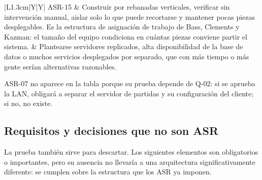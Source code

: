 \begin{tabla}{|L{1.3cm}|Y|Y|}
ASR-15 &
Construir por rebanadas verticales, verificar sin intervención manual, aislar solo lo que puede recortarse y mantener pocas piezas desplegables. Es la estructura de asignación de trabajo de Bass, Clements y Kazman: el tamaño del equipo condiciona en cuántas piezas conviene partir el sistema. &
Plantearse servidores replicados, alta disponibilidad de la base de datos o muchos servicios desplegados por separado, que con más tiempo o más gente serían alternativas razonables. \\ \hline
\end{tabla}

ASR-07 no aparece en la tabla porque su prueba depende de Q-02: si se aprueba la LAN, obligará a separar el servidor de partidas y su configuración del cliente; si no, no existe.

\subsection{Requisitos y decisiones que no son ASR}\label{sec:asr:no}

La prueba también sirve para descartar. Los siguientes elementos son obligatorios o importantes, pero su ausencia no llevaría a una arquitectura significativamente diferente: se cumplen sobre la estructura que los ASR ya imponen.

